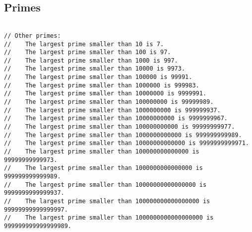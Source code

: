 \subsection{Primes}
\begin{lstlisting}

// Other primes:
//    The largest prime smaller than 10 is 7.
//    The largest prime smaller than 100 is 97.
//    The largest prime smaller than 1000 is 997.
//    The largest prime smaller than 10000 is 9973.
//    The largest prime smaller than 100000 is 99991.
//    The largest prime smaller than 1000000 is 999983.
//    The largest prime smaller than 10000000 is 9999991.
//    The largest prime smaller than 100000000 is 99999989.
//    The largest prime smaller than 1000000000 is 999999937.
//    The largest prime smaller than 10000000000 is 9999999967.
//    The largest prime smaller than 100000000000 is 99999999977.
//    The largest prime smaller than 1000000000000 is 999999999989.
//    The largest prime smaller than 10000000000000 is 9999999999971.
//    The largest prime smaller than 100000000000000 is 99999999999973.
//    The largest prime smaller than 1000000000000000 is 999999999999989.
//    The largest prime smaller than 10000000000000000 is 9999999999999937.
//    The largest prime smaller than 100000000000000000 is 99999999999999997.
//    The largest prime smaller than 1000000000000000000 is 999999999999999989.

\end{lstlisting}